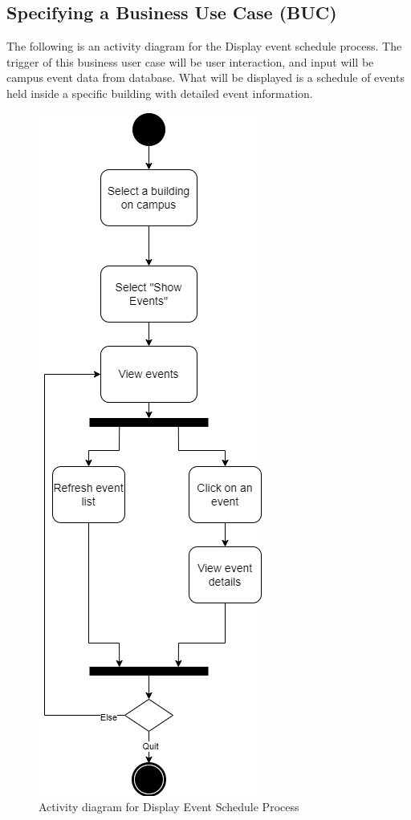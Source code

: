 \documentclass[12pt]{article}
\begin{document}
\subsection{Specifying a Business Use Case (BUC)}

The following is an activity diagram for the Display event schedule process. The trigger of this business user case will be user interaction, and input will be campus event data from database. What will be displayed is a schedule of events held inside a specific building with detailed event information.
\begin{figure}[H]
\begin{center}
\includegraphics[scale=0.5]{BUC_Activity_Diagram.png}
\end{center}
\caption{Activity diagram for Display Event Schedule Process}
\end{figure}
\end{document}
